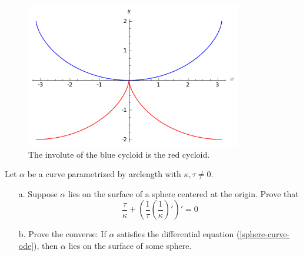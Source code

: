 \documentclass[Shifrin_Solutions_Spring_2018]{subfiles}
\begin{document}
\begin{figure}[h]
\centering
\includegraphics[height=2.5in]{picturebook/ch1sec2/ex1-2-17}
\caption{The involute of the blue cycloid is the red cycloid.}
\end{figure}





\begin{exercise}
Let $\alpha$ be a curve parametrized by arclength with $\kappa,\tau \neq 0$.
\begin{itemize}
\item[a.] Suppose $\alpha$ lies on the surface of a sphere centered at the origin. Prove that
\begin{equation}\label{sphere-curve-ode}
\dfrac{\tau}{\kappa} + \left(\dfrac{1}{\tau} \left(\dfrac{1}{\kappa}\right)' \right)' =0
\end{equation}

\item[b.] Prove the converse: If $\alpha$ satisfies the differential equation (\ref{sphere-curve-ode}), then $\alpha$ lies on the surface of some sphere.
\end{itemize}
\end{exercise}
\end{document}
